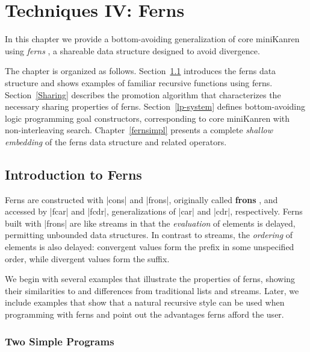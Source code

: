 \chapter{Techniques IV:  Ferns}\label{fernschapter}

In this chapter we provide a bottom-avoiding generalization of core
miniKanren using \emph{ferns} \cite{ferns81}, a shareable data
structure designed to avoid divergence.

The chapter is organized as follows. Section~\ref{fernsintro}
introduces the ferns data structure and shows examples of familiar
recursive functions using ferns.  Section~\ref{Sharing} describes the
promotion algorithm \cite{Friedman79b} that characterizes the
necessary sharing properties of ferns.  Section~\ref{lp-system}
defines bottom-avoiding logic programming goal constructors,
corresponding to core miniKanren with non-interleaving search.
Chapter~\ref{fernsimpl} presents a complete \emph{shallow
  embedding} \cite{Boulton92tassel.experience} of the ferns data
structure and related operators.

\section{Introduction to Ferns}\label{fernsintro}

Ferns are constructed with \scheme|cons| and \scheme|frons|,
originally called \textbf{frons} \cite{DFried80}, and accessed by
\scheme|fcar| and \scheme|fcdr|, generalizations of \scheme|car| and
\scheme|cdr|, respectively.  Ferns built with \scheme|frons| are like
streams in that the \emph{evaluation} of elements is delayed,
permitting unbounded data structures.  In contrast to streams, the
\emph{ordering} of elements is also delayed: convergent values form
the prefix in some unspecified order, while divergent values form the
suffix.

We begin with several examples that illustrate the
properties of ferns, showing their similarities to
and differences from traditional lists and streams.  Later, we include
examples that show that a natural recursive style can be used when
programming with ferns and point out the advantages ferns afford the
user.

\subsection{Two Simple Programs}

